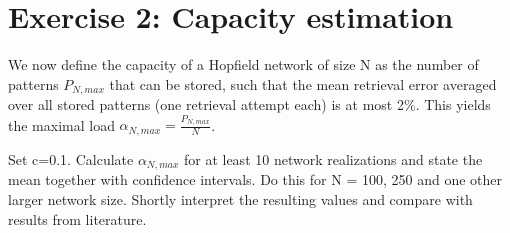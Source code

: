 \section{Exercise 2: Capacity estimation}

\begin{itshape}
\small
We now define the capacity of a Hopfield network of size N as the number of patterns $P_{N,max}$ that can be stored, such that the mean retrieval error averaged over all stored patterns (one retrieval attempt each) is at most 2$\%$. This yields the maximal load $\alpha_{N,max} = \frac{P_{N,max} }{N}$.

Set c=0.1. Calculate $\alpha_{N,max}$ for at least 10 network realizations and state the mean together with confidence intervals. Do this for N = 100, 250 and one other larger network size. Shortly interpret the resulting values and compare with results from literature.
\end{itshape}




